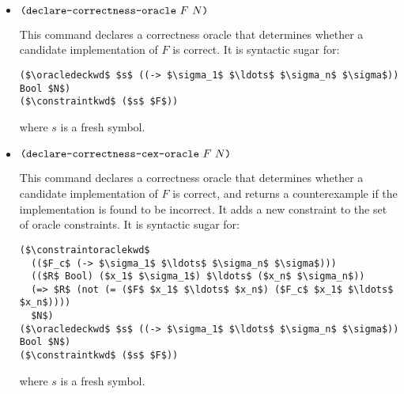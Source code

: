 \documentclass[english,a4paper,10pt]{article}
\begin{document}
\begin{itemize}
This command declares a counter-example oracle for synthesis function $F$.
It is syntactic sugar for:

\begin{lstlisting}[language=SyGuS-Desugar]
($\constraintoraclekwd$
  (($F_c$ (-> $\sigma_1$ $\ldots$ $\sigma_n$ $\sigma$)))
  (($R$ Bool) ($x_1$ $\sigma_1$) $\ldots$ ($x_n$ $\sigma_n$))
  (=> $R$ (not (= ($F$ $x_1$ $\ldots$ $x_n$) ($F_c$ $x_1$ $\ldots$ $x_n$))))
  $N$)
\end{lstlisting}

where $F_c$ is a candidate implementation for $F$, and $R$ is a boolean that indicates that the oracle was able to find a counterexample.


\item$\texttt{(}\texttt{declare-correctness-oracle}\mbox{ }F\mbox{ } N\texttt{)} $

This command declares a correctness oracle that determines
whether a candidate implementation of $F$ is correct.
It is syntactic sugar for:

\begin{lstlisting}[language=SyGuS-Desugar]
($\oracledeckwd$ $s$ ((-> $\sigma_1$ $\ldots$ $\sigma_n$ $\sigma$)) Bool $N$)
($\constraintkwd$ ($s$ $F$))
\end{lstlisting}

where $s$ is a fresh symbol. 

\item$\texttt{(}\texttt{declare-correctness-cex-oracle}\mbox{ } F\mbox{ }N\texttt{)} $

This command declares a correctness oracle that determines
whether a candidate implementation of $F$ is correct,
and returns a counterexample if the implementation is found to be incorrect.
It adds a new constraint to the set of oracle constraints.
It is syntactic sugar for:

\begin{lstlisting}[language=SyGuS-Desugar]
($\constraintoraclekwd$
  (($F_c$ (-> $\sigma_1$ $\ldots$ $\sigma_n$ $\sigma$)))
  (($R$ Bool) ($x_1$ $\sigma_1$) $\ldots$ ($x_n$ $\sigma_n$))
  (=> $R$ (not (= ($F$ $x_1$ $\ldots$ $x_n$) ($F_c$ $x_1$ $\ldots$ $x_n$))))
  $N$)
($\oracledeckwd$ $s$ ((-> $\sigma_1$ $\ldots$ $\sigma_n$ $\sigma$)) Bool $N$)
($\constraintkwd$ ($s$ $F$))
\end{lstlisting}

where $s$ is a fresh symbol. 





\end{itemize}	
\end{document}
